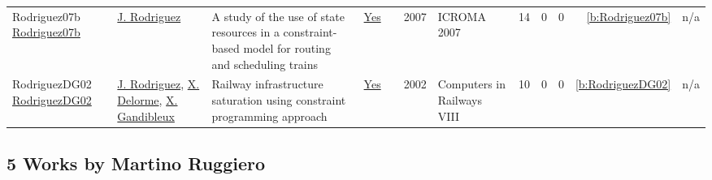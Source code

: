 {\begin{longtable}{>{\raggedright\arraybackslash}p{3cm}>{\raggedright\arraybackslash}p{6cm}>{\raggedright\arraybackslash}p{6.5cm}rrrp{2.5cm}rrrrr}
Rodriguez07b \href{}{Rodriguez07b} & \hyperref[auth:a787]{J. Rodriguez} & A study of the use of state resources in a constraint-based model for routing and scheduling trains & \href{../works/Rodriguez07b.pdf}{Yes} & \cite{Rodriguez07b} & 2007 & ICROMA 2007 & 14 & 0 & 0 & \ref{b:Rodriguez07b} & n/a\\
RodriguezDG02 \href{}{RodriguezDG02} & \hyperref[auth:a787]{J. Rodriguez}, \hyperref[auth:a788]{X. Delorme}, \hyperref[auth:a789]{X. Gandibleux} & Railway infrastructure saturation using constraint programming approach & \href{../works/RodriguezDG02.pdf}{Yes} & \cite{RodriguezDG02} & 2002 & Computers in Railways VIII & 10 & 0 & 0 & \ref{b:RodriguezDG02} & n/a\\
\end{longtable}
}

\clearpage
\subsection{5 Works by Martino Ruggiero}
\label{sec:a724}
